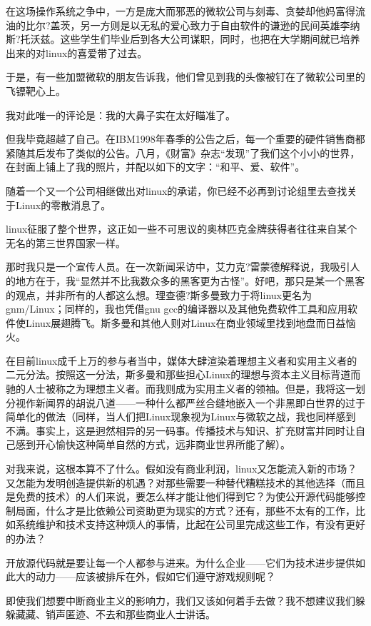 在这场操作系统之争中，一方是庞大而邪恶的微软公司与刻毒、贪婪却他妈富得流油的比尔?盖茨，另一方则是以无私的爱心致力于自由软件的谦逊的民间英雄李纳斯?托沃兹。这些学生们毕业后到各大公司谋职，同时，也把在大学期间就已培养出来的对linux的喜爱带了过去。

于是，有一些加盟微软的朋友告诉我，他们曾见到我的头像被钉在了微软公司里的飞镖靶心上。

我对此唯一的评论是：我的大鼻子实在太好瞄准了。

但我毕竟超越了自己。在IBM1998年春季的公告之后，每一个重要的硬件销售商都紧随其后发布了类似的公告。八月，《财富》杂志“发现”了我们这个小小的世界，在封面上铺上了我的照片，并配以如下的文字：“和平、爱、软件”。

随着一个又一个公司相继做出对linux的承诺，你已经不必再到讨论组里去查找关于Linux的零散消息了。

linux征服了整个世界，这正如一些不可思议的奥林匹克金牌获得者往往来自某个无名的第三世界国家一样。

那时我只是一个宣传人员。在一次新闻采访中，艾力克?雷蒙德解释说，我吸引人的地方在于，我“显然并不比我数众多的黑客更为古怪”。好吧，那只是某一个黑客的观点，并非所有的人都这么想。理查德?斯多曼致力于将linux更名为gnm/Linux；同样的，我也凭借gnu gcc的编译器以及其他免费软件工具和应用软件使Linux展翅腾飞。斯多曼和其他人则对Linux在商业领域里找到地盘而日益恼火。

在目前linux成千上万的参与者当中，媒体大肆渲染着理想主义者和实用主义者的二元分法。按照这一分法，斯多曼和那些担心Linux的理想与资本主义目标背道而驰的人士被称之为理想主义者。而我则成为实用主义者的领袖。但是，我将这一划分视作新闻界的胡说八道——一种什么都严丝合缝地嵌入一个非黑即白世界的过于简单化的做法（同样，当人们把Linux现象视为Linux与微软之战，我也同样感到不满。事实上，这是迥然相异的另一码事。传播技术与知识、扩充财富并同时让自己感到开心愉快这种简单自然的方式，远非商业世界所能了解）。

对我来说，这根本算不了什么。假如没有商业利润，linux又怎能流入新的市场？又怎能为发明创造提供新的机遇？对那些需要一种替代糟糕技术的其他选择（而且是免费的技术）的人们来说，要怎么样才能让他们得到它？为使公开源代码能够控制局面，什么才是比依赖公司资助更为现实的方式？还有，那些不太有的工作，比如系统维护和技术支持这种烦人的事情，比起在公司里完成这些工作，有没有更好的办法？

开放源代码就是要让每一个人都参与进来。为什么企业——它们为技术进步提供如此大的动力——应该被排斥在外，假如它们遵守游戏规则呢？

即使我们想要中断商业主义的影响力，我们又该如何着手去做？我不想建议我们躲躲藏藏、销声匿迹、不去和那些商业人士讲话。

